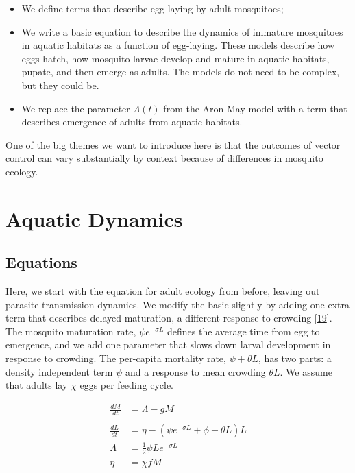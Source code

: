 \documentclass[
]{book}
\begin{document}
\begin{itemize}
\item
  We define terms that describe egg-laying by adult mosquitoes;
\item
  We write a basic equation to describe the dynamics of immature mosquitoes in aquatic habitats as a function of egg-laying. These models describe how eggs hatch, how mosquito larvae develop and mature in aquatic habitats, pupate, and then emerge as adults. The models do not need to be complex, but they could be.
\item
  We replace the parameter \(\Lambda(t)\) from the Aron-May model with a term that
  describes emergence of adults from aquatic habitats.
\end{itemize}

One of the big themes we want to introduce here is that the outcomes of vector control can vary substantially by context because of differences in mosquito ecology.

\hypertarget{aquatic-dynamics}{%
\section{Aquatic Dynamics}\label{aquatic-dynamics}}

\hypertarget{equations}{%
\subsection{Equations}\label{equations}}

Here, we start with the equation for adult ecology from before, leaving out parasite transmission dynamics. We modify the basic slightly by adding one extra term that describes delayed maturation, a different response to crowding {[}\protect\hyperlink{ref-SmithDL2013_LarvalDynamics}{19}{]}. The mosquito maturation rate, \(\psi e^{-\sigma L}\) defines the average time from egg to emergence, and we add one parameter that slows down larval development in response to crowding. The per-capita mortality rate, \(\psi + \theta L\), has two parts: a density independent term \(\psi\) and a response to mean crowding \(\theta L\). We assume that adults lay \(\chi\) eggs per feeding cycle.

\begin{equation}
\begin{array}{rl}
\frac{dM}{dt} &= \Lambda - g M\\  \\ \hline 
\frac{dL}{dt} &= \eta - (\psi e^{-\sigma L} + \phi + \theta L) L \\ 
\Lambda &= \frac{1}{2} \psi L e^{-\sigma L}\\ 
\eta &= \chi f M \\ 
\end{array}
\end{equation}
\end{document}
